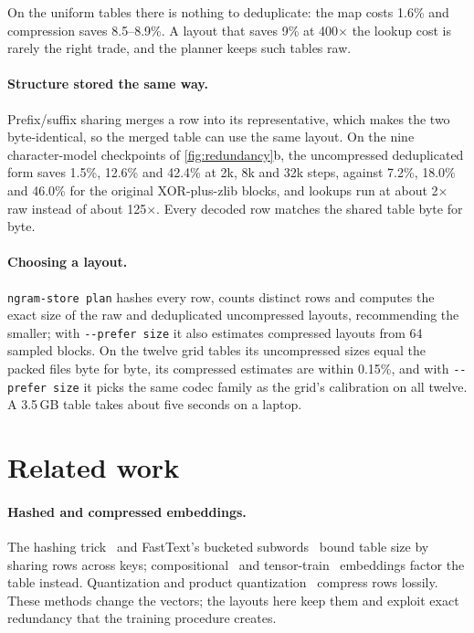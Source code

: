 \documentclass[10pt]{article}
\newcommand{\x}{$\times$}
\begin{document}
On the uniform tables there is nothing to deduplicate: the map costs 1.6\% and compression saves 8.5--8.9\%. A layout that saves 9\% at 400\x{} the lookup cost is rarely the right trade, and the planner keeps such tables raw.

\paragraph{Structure stored the same way.} Prefix/suffix sharing merges a row into its representative, which makes the two byte-identical, so the merged table can use the same layout. On the nine character-model checkpoints of \cref{fig:redundancy}b, the uncompressed deduplicated form saves 1.5\%, 12.6\% and 42.4\% at 2k, 8k and 32k steps, against 7.2\%, 18.0\% and 46.0\% for the original XOR-plus-zlib blocks, and lookups run at about 2\x{} raw instead of about 125\x. Every decoded row matches the shared table byte for byte.

\paragraph{Choosing a layout.}
\label{sec:planner}
\texttt{ngram-store plan} hashes every row, counts distinct rows and computes the exact size of the raw and deduplicated uncompressed layouts, recommending the smaller; with \texttt{-{}-prefer size} it also estimates compressed layouts from 64 sampled blocks. On the twelve grid tables its uncompressed sizes equal the packed files byte for byte, its compressed estimates are within 0.15\%, and with \texttt{-{}-prefer size} it picks the same codec family as the grid's calibration on all twelve. A 3.5\,GB table takes about five seconds on a laptop.

\section{Related work}

\paragraph{Hashed and compressed embeddings.} The hashing trick~\citep{weinberger2009feature} and FastText's bucketed subwords~\citep{bojanowski2017enriching,joulin2017bag} bound table size by sharing rows across keys; compositional~\citep{shi2020compositional} and tensor-train~\citep{yin2021ttrec} embeddings factor the table instead. Quantization and product quantization~\citep{jegou2011product,johnson2019billion} compress rows lossily. These methods change the vectors; the layouts here keep them and exploit exact redundancy that the training procedure creates.
\end{document}
